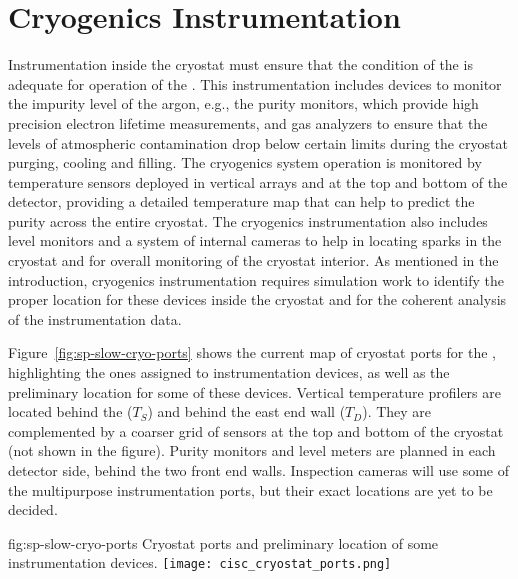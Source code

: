 \section{Cryogenics Instrumentation}
\label{sec:fdsp-cryo-instr} %
\label{sec:fddp-cryo-instr} %
\label{sec:fdgen-cryo-instr} %

Instrumentation inside the cryostat must ensure that the condition of the  is adequate for operation of the .
This instrumentation includes devices to monitor the impurity level of the argon, e.g., the purity monitors, which provide high precision electron lifetime measurements,
and gas analyzers to ensure that the levels of atmospheric contamination drop below certain limits during the cryostat purging, cooling and filling.
The cryogenics system operation is monitored by temperature sensors deployed in vertical arrays and at the top and bottom of the detector, providing a 
detailed \threed temperature map that can help to predict the  purity across the entire cryostat. The cryogenics instrumentation also includes \lar level monitors and
a system of internal cameras to help in locating sparks in the cryostat and for overall monitoring of the cryostat interior. 
As mentioned in the introduction, cryogenics instrumentation requires simulation work to identify the proper location for these devices inside the cryostat and
for the coherent analysis of the instrumentation data. 

Figure~\ref{fig:sp-slow-cryo-ports} shows the current map of cryostat ports for the , highlighting the ones assigned to instrumentation devices,
as well as the preliminary location for some of these devices. Vertical temperature profilers are located behind the  ($T_S$) and behind the east end wall ($T_D$).
They are complemented by a coarser \twod grid of sensors at the top and bottom of the cryostat (not shown in the figure). Purity monitors and level meters are planned
in each detector side, behind the two front end walls. Inspection cameras will use some of the multipurpose instrumentation ports, but their exact locations are yet to be decided. 


\begin{dunefigure}{fig:sp-slow-cryo-ports}
{Cryostat ports and preliminary location of some instrumentation devices. }
\texttt{[image: cisc\_cryostat\_ports.png]}
\end{dunefigure}


